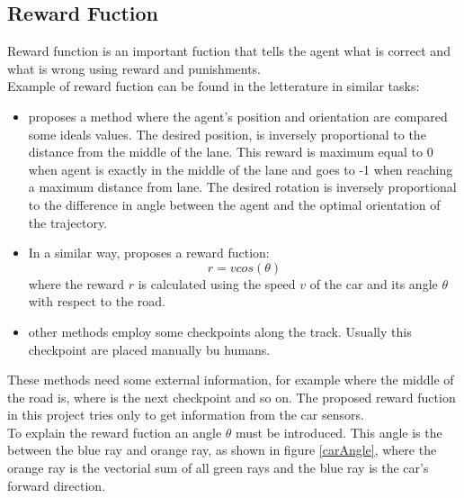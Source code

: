 \documentclass[14pt]{extarticle}
\def\sp{\vspace{5pt}}
\def\pp{\vspace{10pt}\newline}
\begin{document}
\begin{flushleft}
	\subsection{Reward Fuction} \label{rewardfuc}
	\sp
	Reward function is an important fuction that tells the agent what is correct and what is wrong using reward and punishments. \\
	Example of reward fuction can be found in the letterature in similar tasks:
	\begin{itemize}
	\item \cite{Paper1} proposes a method where the agent's position and orientation are compared some ideals values. The desired position, is inversely proportional to the distance from the middle of the lane. This reward is maximum equal to 0 when agent is exactly in the middle of the lane and goes to -1 when reaching a maximum distance from lane. The desired rotation is inversely proportional to the difference in angle between the agent and the optimal orientation of the trajectory.
	\item In a similar way, \cite{Paper2} proposes a reward fuction:
	\[
	 r = v cos(\theta)
	\]
	where the reward $r$ is calculated using the speed $v$ of the car and its angle $\theta$ with respect to the road.
	\item other methods employ some checkpoints along the track. Usually this checkpoint are placed manually bu humans.
	\end{itemize}
	These methods need some external information, for example where the middle of the road is, where is the next checkpoint and so on.
	\pp 
	The proposed reward fuction in this project tries only to get information from the car sensors. \\
To explain the reward fuction an angle $\theta$ must be introduced. This angle is the between the blue ray and orange ray, as shown in figure \ref{carAngle}, where the orange ray is the vectorial sum of all green rays and the blue ray is the car's forward direction.


\end{flushleft}
\end{document}

